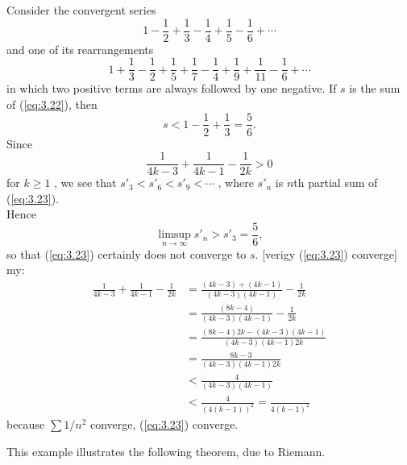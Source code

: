 \begin{myExample}
    Consider the convergent series
    \begin{equation}
        \label{eq:3.22}
        1
        -\frac{1}{2}
        +\frac{1}{3}
        -\frac{1}{4}
        +\frac{1}{5}
        -\frac{1}{6}
        +\cdots
    \end{equation}
    and one of its rearrangements
    \begin{equation}
        \label{eq:3.23}
        1
        +\frac{1}{3}
        -\frac{1}{2}
        +\frac{1}{5}
        +\frac{1}{7}
        -\frac{1}{4}
        +\frac{1}{9}
        +\frac{1}{11}
        -\frac{1}{6}
        +\cdots
    \end{equation}
    in which two positive terms are always followed by one negative.
    If $s$ is the sum of (\ref{eq:3.22}), then
    \begin{equation*}
        s < 1 - \frac{1}{2} + \frac{1}{3} = \frac{5}{6}.
    \end{equation*}
    Since
    \begin{equation*}
        \frac{1}{4k-3} + 
        \frac{1}{4k-1} - 
        \frac{1}{2k} > 0
    \end{equation*}
    for $k \geq 1$ , we see that $s'_3 < s'_6 < s'_9 < \cdots$ , where $s'_n$ is $n$th partial sum of (\ref{eq:3.23}).\\    
    Hence
    \begin{equation*}
        \limsup_{n \to \infty} s'_n > s'_3 = \frac{5}{6},
    \end{equation*}
    so that (\ref{eq:3.23}) certainly does not converge to $s$.
    [verigy (\ref{eq:3.23}) converge]
    my:
    \begin{align*}
        \frac{1}{4k-3} + 
        \frac{1}{4k-1} - 
        \frac{1}{2k} 
        &= \frac{(4k-3) + (4k-1)}{(4k-3)(4k-1)} - \frac{1}{2k} \\
        &= \frac{(8k-4)}{(4k-3)(4k-1)} - \frac{1}{2k} \\
        &= \frac{(8k-4)2k - (4k-3)(4k-1)}{(4k-3)(4k-1)2k} \\
        &= \frac{8k-3}{(4k-3)(4k-1)2k} \\
        &< \frac{4}{(4k-3)(4k-1)} \\
        &< \frac{4}{(4(k-1))^2}
        = \frac{}{4(k-1)^2}
    \end{align*}
    because $\sum 1/n^2$ converge, (\ref{eq:3.23}) converge.
\end{myExample}

This example illustrates the following theorem, due to Riemann.

